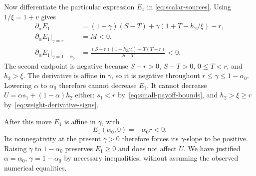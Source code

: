 \documentclass[11pt]{article}
\theoremstyle{remark}
\theoremstyle{plain}
\begin{document}
Now differentiate the particular expression $E_1$ in
\eqref{eq:scalar-sources}. Using $1/\xi=1+v$ gives
\begin{equation}
 \begin{aligned}
 \partial_\alpha E_1
   &=(1-\gamma)(S-T)+\gamma(1+T-h_2/\xi)-r,\\
 \left.\partial_\alpha E_1\right|_{\gamma=r}&=M<0,\\
 \left.\partial_\alpha E_1\right|_{\gamma=1-\alpha_0}
   &=\frac{(S-r)(1-h_2/\xi)+T(T-r)}{S-T}<0.
 \end{aligned}
 \label{eq:weight-E1-derivative}
\end{equation}
The second endpoint is negative because $S-r>0$, $S-T>0$,
$0\le T<r$, and $h_2>\xi$. The derivative is affine in $\gamma$,
so it is negative throughout $r\le\gamma\le1-\alpha_0$.
Lowering $\alpha$ to $\alpha_0$ therefore cannot decrease $E_1$.
It cannot decrease $U=\alpha s_1+(1-\alpha)h_2$ either:
$s_1<r$ by~\eqref{eq:small-payoff-bounds}, and
$h_2>\xi\ge r$ by~\eqref{eq:weight-derivative-signs}.

After this move $E_1$ is affine in $\gamma$, with
\begin{equation}
 E_1(\alpha_0,0)=-\alpha_0 r<0.
 \label{eq:weight-E1-zero}
\end{equation}
Its nonnegativity at the present $\gamma>0$ therefore forces its
$\gamma$-slope to be positive. Raising $\gamma$ to $1-\alpha_0$ preserves
$E_1\ge0$ and does not affect $U$. We have justified
$\alpha=\alpha_0$, $\gamma=1-\alpha_0$ by necessary inequalities, without
assuming the observed numerical equalities.
\end{document}
